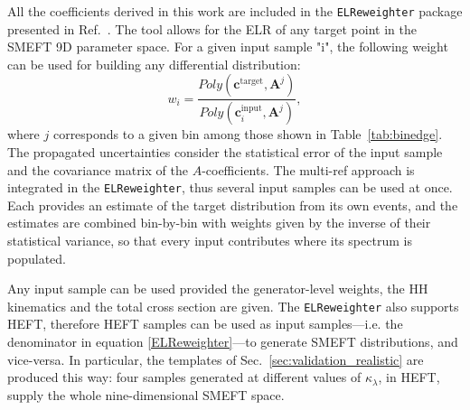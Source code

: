 All the coefficients derived in this work are included in the \texttt{ELReweighter} package presented in Ref.~\cite{ELR_R5}. The tool allows for the ELR of any target point in the SMEFT 9D parameter space. For a given input sample "i", the following weight can be used for building any differential distribution:
\begin{equation}\label{ELReweighter}
    w_i=\frac{Poly(\mathbf{c}^{\text{target}}, \mathbf{A}^j)}{Poly(\mathbf{c}^{\text{input}}_i, \mathbf{A}^j)},
\end{equation}
where $j$ corresponds to a given bin among those shown in Table~\ref{tab:binedge}. The propagated uncertainties consider the statistical error of the input sample and the covariance matrix of the $A$-coefficients. The multi-ref approach is integrated in the \texttt{ELReweighter}, thus several input samples can be used at once. Each provides an estimate of the target distribution from its own events, and the estimates are combined bin-by-bin with weights given by the inverse of their statistical variance, so that every input contributes where its \mHH spectrum is populated.

Any input sample can be used provided the generator-level weights, the HH kinematics and the total cross section are given. The \texttt{ELReweighter} also supports HEFT, therefore HEFT samples can be used as input samples---i.e. the denominator in equation \eqref{ELReweighter}---to generate SMEFT distributions, and vice-versa. In particular, the templates of Sec.~\ref{sec:validation_realistic} are produced this way: four samples generated at different values of $\kappa_\lambda$, in HEFT, supply the whole nine-dimensional SMEFT space. 




